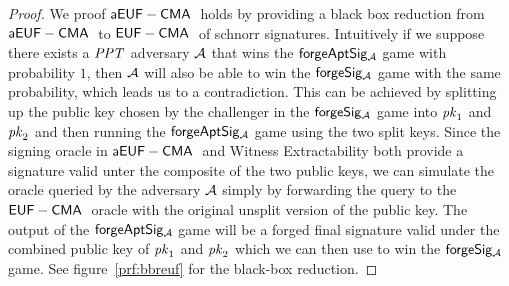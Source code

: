 \begin{proof}
    We proof $\mathsf{aEUF-CMA\;}$ holds by providing a black box reduction from $\mathsf{aEUF-CMA\;}$ to $\mathsf{EUF-CMA\;}$ of schnorr signatures.
    Intuitively if we suppose there exists a $\mathit{PPT}$ adversary $\mathcal{A}$ that wins the $\mathsf{forgeAptSig_{\mathcal{A}}}$ game with probability $1$,
    then $\mathcal{A}$ will also be able to win the $\mathsf{forgeSig_{\mathcal{A}}}$ game with the same probability, which leads us to a contradiction.
    This can be achieved by splitting up the public key chosen by the challenger in the $\mathsf{forgeSig_{\mathcal{A}}}$ game into $\mathit{pk}_1$ and $\mathit{pk}_2$ and then running the
    $\mathsf{forgeAptSig_{\mathcal{A}}}$ game using the two split keys.
    Since the signing oracle in $\mathsf{aEUF-CMA\;}$ and Witness Extractability both provide a signature valid unter the composite of the two public keys, we can simulate the oracle
    queried by the adversary $\mathcal{A}$ simply by forwarding the query to the $\mathsf{EUF-CMA\;}$ oracle with the original unsplit version of the public key.
    The output of the $\mathsf{forgeAptSig_{\mathcal{A}}}$ game will be a forged final signature valid under the combined public key of $\mathit{pk}_1$ and $\mathit{pk}_2$
    which we can then use to win the $\mathsf{forgeSig_{\mathcal{A}}}$ game. See figure~\ref{prf:bbreuf} for the black-box reduction.


\end{proof}
